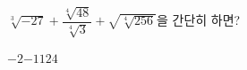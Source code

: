 $\sqrt[3]{-27}+\dfrac{\sqrt[4]{48}}{\sqrt[4]{3}}+\sqrt{\sqrt[4]{256}}$을 간단히 하면?
\begin{choices32}{$-2$}{$-1$}{$1$}{$2$}{$4$}\end{choices32}
